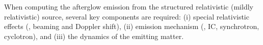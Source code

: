 %
%

%
When computing the afterglow emission from the structured relativistic 
(mildly relativistic) source, several key components are required: 
(i) special relativistic effects (\eg, beaming and Doppler shift),
(ii) emission mechanism (\eg, \ac{IC}, synchrotron, cyclotron), 
and (iii) the dynamics of the emitting matter. 

